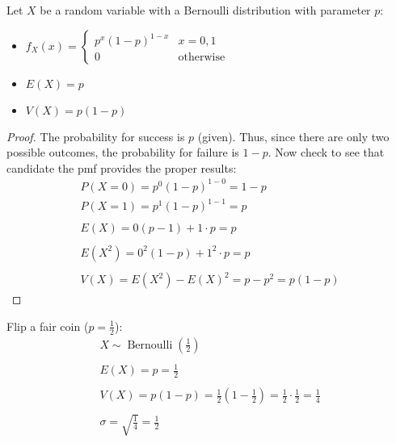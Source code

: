 \documentclass[letterpaper,12pt,fleqn]{article}
\DeclareMathOperator{\bern}{Bernoulli}
\renewcommand{\o}{\sigma}
\begin{document}
\begin{theorem}
  Let \(X\) be a random variable with a Bernoulli distribution with parameter \(p\):
  \begin{itemize}
  \item \(f_X(x)=\begin{cases}
    p^x(1-p)^{1-x} & x=0,1 \\
    0 & \text{otherwise}
  \end{cases}\)
  \item \(E(X)=p\)
  \item \(V(X)=p(1-p)\)
  \end{itemize}
\end{theorem}

\begin{proof}
  The probability for success is \(p\) (given).  Thus, since there are only two possible outcomes, the probability for
  failure is \(1-p\).  Now check to see that candidate the pmf provides the proper results:
  \begin{gather*}
    P(X=0)=p^0(1-p)^{1-0}=1-p \\
    P(X=1)=p^1(1-p)^{1-1}=p \\
    \\
    E(X)=0(p-1)+1\cdot p=p \\
    \\
    E(X^2)=0^2(1-p)+1^2\cdot p=p \\
    \\
    V(X)=E(X^2)-E(X)^2=p-p^2=p(1-p)
  \end{gather*}
\end{proof}

\begin{example}
  Flip a fair coin (\(p=\frac{1}{2}\)):
  \begin{gather*}
    X\sim\bern\left(\frac{1}{2}\right) \\
    \\
    E(X)=p=\frac{1}{2} \\
    \\
    V(X)=p(1-p)=\frac{1}{2}\left(1-\frac{1}{2}\right)=\frac{1}{2}\cdot\frac{1}{2}=\frac{1}{4} \\
    \\
    \o=\sqrt{\frac{1}{4}}=\frac{1}{2}
  \end{gather*}
\end{example}
\end{document}
